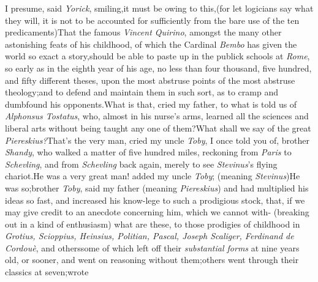 \documentclass{article}
\begin{document}
I presume, said \textit{Yorick}, smiling,\tsk it must be owing to
this,\tsk (for let logicians say what they will, it is not to be accounted
for sufficiently from the bare use of the ten predicaments)\tsh That
the famous \textit{Vincent Quirino}, amongst the many other astonishing feats of
his childhood, of which the Cardinal \textit{Bembo} has given the world so exact
a story,\tsk should be able to paste up in the publick schools\pb
at \textit{Rome}, so early as in the eighth year of his age, no less than four
thousand, five hundred, and fifty different theses, upon the most abstruse points of
the most abstruse theology;\tsk and to defend and maintain them in such sort, as to
cramp and dumbfound his opponents.\tsh\break What is that, cried my father, to what
is told us of \textit{Alphonsus Tostatus}, who, almost in his nurse’s arms, learned
all the sciences and liberal arts without being taught any one of them?\tsh What
shall we say of the great \textit{Piereskius?}\tsk\break That’s the very man, cried
my uncle \textit{Toby}, I once told you of, brother \textit{Shandy}, who walked a
matter of five hundred miles, reckoning from \textit{Paris} to \textit{Schevling},
and from \textit{Schevling} back again, merely to see \textit{Stevinus}’s flying
chariot.\tsh He was a very great man! added my uncle \textit{Toby}; (meaning
\textit{Stevinus})\tsk He was so;\pb brother \textit{Toby}, said my father (meaning
\textit{Piereskius})\tsk\enlargethispage\baselineskip
and had multiplied his ideas so fast, and increased his
know-\break lege to such a prodigious stock, that, if we may give credit to an anecdote
concerning him, which we cannot with-\break{}
(breaking out in a kind of enthusiasm)\break
\tsk what are
these, to those prodigies of childhood in \textit{Grotius, Scioppius, Heinsius,
Politian, Pascal, Joseph Scaliger, Ferdinand de Cordouè}, and others\tsk some of
which left off their \textit{substantial forms} at\pb
nine years old, or sooner, and went on reasoning without them;\tsk others went
through their classics at seven;\tsk wrote \break
\end{document}
